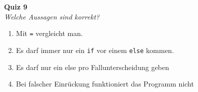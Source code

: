 \textbf{Quiz 9}\\
\textit{Welche Aussagen sind korrekt?}
\begin{enumerate}[label=\alph*)]
    \item Mit \texttt{=} vergleicht man.
    \item Es darf immer nur ein \texttt{if} vor einem \texttt{else} kommen.
    \item Es darf nur ein else pro Fallunterscheidung geben
    \item Bei falscher Einrückung funktioniert das Programm nicht
\end{enumerate}

